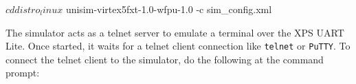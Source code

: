 \begin{script}
$ cd distro_linux
$ unisim-virtex5fxt-1.0-wfpu-1.0 -c sim_config.xml
\end{script}

The simulator acts as a telnet server to emulate a terminal over the XPS UART Lite. Once started, it waits for a telnet client connection like \texttt{telnet} or \texttt{PuTTY}. To connect the telnet client to the simulator, do the following at the command prompt:

